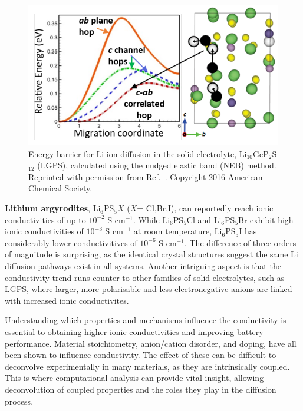 \documentclass[../main.tex]{subfiles}
\begin{document}
\begin{figure}
    \centering
    \includegraphics[scale=1.2]{figures/lgps.png}
    \caption{Energy barrier for Li-ion diffusion in the solid electrolyte, Li$_{10}$GeP$_2$S$_{12}$ (LGPS), calculated using the nudged elastic band (NEB) method. Reprinted with permission from Ref.~. Copyright 2016 American Chemical Society.}
    \label{fig:lgps}
\end{figure}

\textbf{Lithium argyrodites}, Li$_6$PS$_{5}X$ ($X$= Cl,Br,I), can reportedly reach ionic conductivities of up to $10^{-2}$ S cm$^{-1}$.\cite{deiseroth_li6ps5x_2008} While Li$_6$PS$_{5}$Cl and Li$_6$PS$_{5}$Br exhibit high ionic conductivities of $10^{-3}$ S cm$^{-1}$ at room temperature, Li$_6$PS$_{5}$I has considerably lower conductivitives of $10^{-6}$ S cm$^{-1}$.\cite{zhou2021innovative} The difference of three orders of magnitude is surprising, as the identical crystal structures suggest the same Li diffusion pathways exist in all systems. Another intriguing aspect is that the conductivity trend runs counter to other families of solid electrolytes, such as LGPS, where larger, more polarisable and less electronegative anions are linked with increased ionic conductivites.\cite{bachman2016inorganic}

Understanding which properties and mechanisms influence the conductivity is essential to obtaining higher ionic conductivities and improving battery performance. Material stoichiometry, anion/cation disorder, and doping, have all been shown to influence conductivity. The effect of these can be difficult to deconvolve experimentally in many materials, as they are intrinsically coupled. This is where computational analysis can provide vital insight, allowing deconvolution of coupled properties and the roles they play in the diffusion process.
\end{document}
